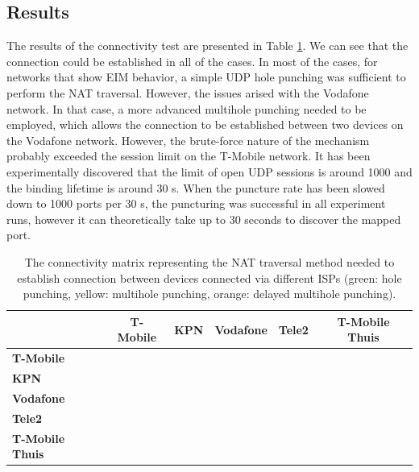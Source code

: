 \subsection{Results}

The results of the connectivity test are presented in Table \ref{table_cgnat_analysis}. We can see that the connection could be established in all of the cases. In most of the cases, for networks that show EIM behavior, a simple UDP hole punching was sufficient to perform the NAT traversal. However, the issues arised with the Vodafone network. In that case, a more advanced multihole punching needed to be employed, which allows the connection to be established between two devices on the Vodafone network. However, the brute-force nature of the mechanism probably exceeded the session limit on the T-Mobile network. It has been experimentally discovered that the limit of open UDP sessions is around 1000 and the binding lifetime is around 30 s. When the puncture rate has been slowed down to 1000 ports per 30 s, the puncturing was successful in all experiment runs, however it can theoretically take up to 30 seconds to discover the mapped port.

\begin{table}[h!]
    \centering
    \begin{tabular}{ | l | c | c | c | c | c | }
        \hline
        \textbf{} & \textbf{T-Mobile} & \textbf{KPN} & \textbf{Vodafone} & \textbf{Tele2} & \textbf{T-Mobile Thuis} \\
        \hline
        \textbf{T-Mobile} & \cellcolor{green!25} &  &  &  &  \\
        \hline
        \textbf{KPN} & \cellcolor{green!25}& \cellcolor{green!25} &  &  &  \\
        \hline
        \textbf{Vodafone} & \cellcolor{orange!25} & \cellcolor{yellow!25} & \cellcolor{yellow!25} &  &  \\
        \hline
        \textbf{Tele2} & \cellcolor{green!25} & \cellcolor{green!25} & \cellcolor{green!25} & \cellcolor{green!25} & \\
        \hline
        \textbf{T-Mobile Thuis} & \cellcolor{green!25} & \cellcolor{green!25} & \cellcolor{green!25} & \cellcolor{green!25} & \cellcolor{green!25} \\
        \hline
    \end{tabular}
    \caption{The connectivity matrix representing the NAT traversal method needed to establish connection between devices connected via different ISPs (green: hole punching, yellow: multihole punching, orange: delayed multihole punching).}
    \label{table_cgnat_analysis}
\end{table}


